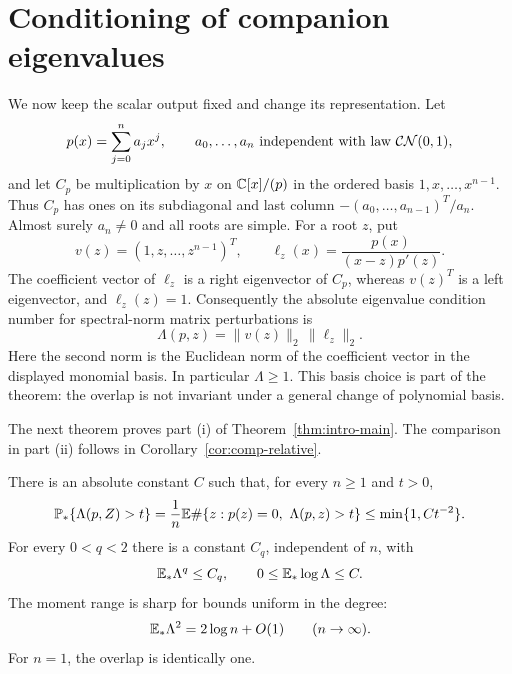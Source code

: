 \section{Conditioning of companion eigenvalues}
\label{sec:companion}

We now keep the scalar output fixed and change its representation.  Let
\[
  p(x)=\sum_{j=0}^{n}a_jx^j,
  \qquad a_0,\ldots,a_n\ \text{independent with law }\mathcal{CN}(0,1),
\]
and let $C_p$ be multiplication by $x$ on $\mathbb C[x]/(p)$ in the ordered
basis $1,x,\ldots,x^{n-1}$.  Thus $C_p$ has ones on its subdiagonal and
last column $-(a_0,\ldots,a_{n-1})^{T}/a_n$.  Almost surely $a_n\ne0$
and all roots are simple.  For a root $z$, put
\[
  v(z)=(1,z,\ldots,z^{n-1})^T,
  \qquad
  \ell_z(x)=\frac{p(x)}{(x-z)p'(z)}.
\]
The coefficient vector of $\ell_z$ is a right eigenvector of $C_p$,
whereas $v(z)^T$ is a left eigenvector, and $\ell_z(z)=1$.  Consequently
the absolute eigenvalue condition number for spectral-norm matrix
perturbations is
\begin{equation}\label{eq:comp-overlap}
  \Lambda(p,z)=\|v(z)\|_2\,\|\ell_z\|_2.
\end{equation}
Here the second norm is the Euclidean norm of the coefficient vector in
the displayed monomial basis.  In particular $\Lambda\ge1$.  This basis
choice is part of the theorem: the overlap is not invariant under a
general change of polynomial basis.

The next theorem proves part (i) of Theorem~\ref{thm:intro-main}.
The comparison in part (ii) follows in Corollary~\ref{cor:comp-relative}.

\begin{theorem}\label{thm:comp-main}
There is an absolute constant $C$ such that, for every $n\ge1$ and $t>0$,
\begin{equation}\label{eq:comp-weak-two}
  \mathbb P_*\{\Lambda(p,Z)>t\}
  =\frac1n\mathbb E\#\{z:p(z)=0,\ \Lambda(p,z)>t\}
  \le \min\{1,Ct^{-2}\}.
\end{equation}
For every $0<q<2$ there is a constant $C_q$, independent of $n$, with
\[
  \mathbb E_*\Lambda^q\le C_q,
  \qquad 0\le\mathbb E_*\log\Lambda\le C.
\]
The moment range is sharp for bounds uniform in the degree:
\begin{equation}\label{eq:comp-second-asymptotic}
  \mathbb E_*\Lambda^2=2\log n+O(1)
  \qquad(n\to\infty).
\end{equation}
For $n=1$, the overlap is identically one.
\end{theorem}

